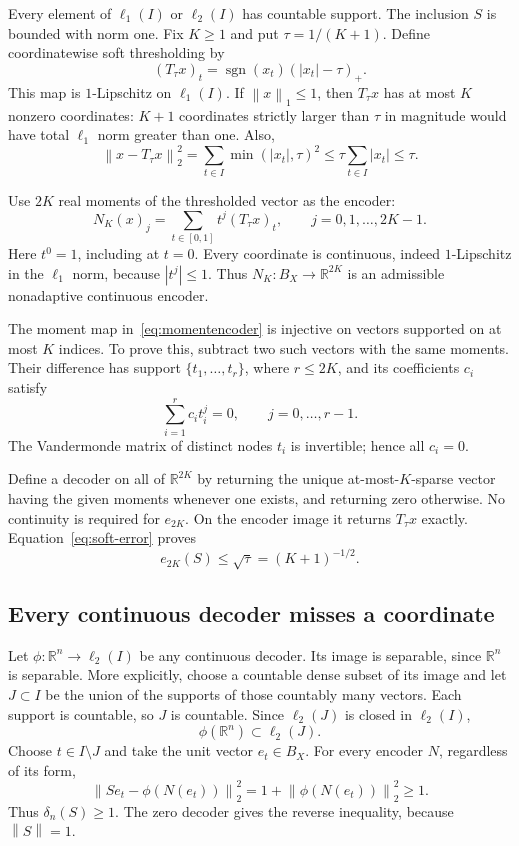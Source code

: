 \documentclass[11pt,a4paper]{article}
\theoremstyle{remark}
\newcommand{\R}{\mathbb R}
\newcommand{\norm}[1]{\left\lVert #1\right\rVert}
\newcommand{\sgn}{\operatorname{sgn}}
\begin{document}
Every element of $\ell_1(I)$ or $\ell_2(I)$ has countable support. The inclusion $S$ is bounded with norm one. Fix $K\ge1$ and put $\tau=1/(K+1)$. Define coordinatewise soft thresholding by
\[
 (T_\tau x)_t=\sgn(x_t)(|x_t|-\tau)_+.
\]
This map is $1$-Lipschitz on $\ell_1(I)$. If $\norm{x}_1\le1$, then $T_\tau x$ has at most $K$ nonzero coordinates: $K+1$ coordinates strictly larger than $\tau$ in magnitude would have total $\ell_1$ norm greater than one. Also,
\begin{equation}\label{eq:soft-error}
 \norm{x-T_\tau x}_2^2
 =\sum_{t\in I}\min(|x_t|,\tau)^2
 \le\tau\sum_{t\in I}|x_t|\le\tau.
\end{equation}

Use $2K$ real moments of the thresholded vector as the encoder:
\begin{equation}\label{eq:momentencoder}
 N_K(x)_j=\sum_{t\in[0,1]}t^j(T_\tau x)_t,
 \qquad j=0,1,\ldots,2K-1.
\end{equation}
Here $t^0=1$, including at $t=0$. Every coordinate is continuous, indeed $1$-Lipschitz in the $\ell_1$ norm, because $|t^j|\le1$. Thus $N_K:B_X\to\R^{2K}$ is an admissible nonadaptive continuous encoder.

The moment map in~\eqref{eq:momentencoder} is injective on vectors supported on at most $K$ indices. To prove this, subtract two such vectors with the same moments. Their difference has support $\{t_1,\ldots,t_r\}$, where $r\le2K$, and its coefficients $c_i$ satisfy
\[
 \sum_{i=1}^r c_i t_i^j=0,\qquad j=0,\ldots,r-1.
\]
The Vandermonde matrix of distinct nodes $t_i$ is invertible; hence all $c_i=0$.

Define a decoder on all of $\R^{2K}$ by returning the unique at-most-$K$-sparse vector having the given moments whenever one exists, and returning zero otherwise. No continuity is required for $e_{2K}$. On the encoder image it returns $T_\tau x$ exactly. Equation~\eqref{eq:soft-error} proves
\[
 e_{2K}(S)\le\sqrt\tau=(K+1)^{-1/2}.
\]

\subsection{Every continuous decoder misses a coordinate}

Let $\phi:\R^n\to\ell_2(I)$ be any continuous decoder. Its image is separable, since $\R^n$ is separable. More explicitly, choose a countable dense subset of its image and let $J\subset I$ be the union of the supports of those countably many vectors. Each support is countable, so $J$ is countable. Since $\ell_2(J)$ is closed in $\ell_2(I)$,
\[
 \phi(\R^n)\subset\ell_2(J).
\]
Choose $t\in I\setminus J$ and take the unit vector $e_t\in B_X$. For every encoder $N$, regardless of its form,
\[
 \norm{Se_t-\phi(N(e_t))}_2^2
 =1+\norm{\phi(N(e_t))}_2^2\ge1.
\]
Thus $\delta_n(S)\ge1$. The zero decoder gives the reverse inequality, because $\norm S=1$.
\end{document}
